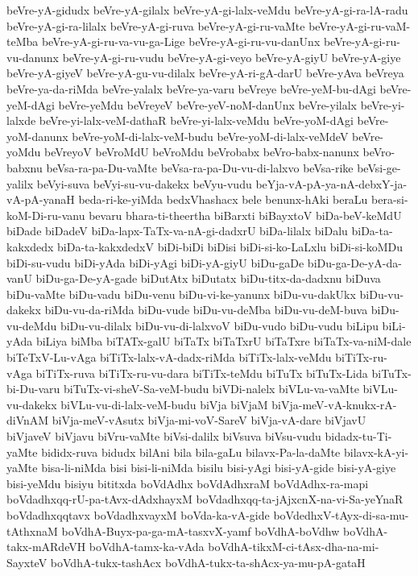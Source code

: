 {beVre-yA-gidudx
beVre-yA-gilalx
beVre-yA-gi-lalx-veMdu
beVre-yA-gi-ra-lA-radu
beVre-yA-gi-ra-lilalx
beVre-yA-gi-ruva
beVre-yA-gi-ru-vaMte
beVre-yA-gi-ru-vaM-teMba
beVre-yA-gi-ru-va-vu-ga-Lige
beVre-yA-gi-ru-vu-danUnx
beVre-yA-gi-ru-vu-danunx
beVre-yA-gi-ru-vudu
beVre-yA-gi-veyo
beVre-yA-giyU
beVre-yA-giye
beVre-yA-giyeV
beVre-yA-gu-vu-dilalx
beVre-yA-ri-gA-darU
beVre-yAva
beVreya
beVre-ya-da-riMda
beVre-yalalx
beVre-ya-varu
beVreye
beVre-yeM-bu-dAgi
beVre-yeM-dAgi
beVre-yeMdu
beVreyeV
beVre-yeV-noM-danUnx
beVre-yilalx
beVre-yi-lalxde
beVre-yi-lalx-veM-dathaR
beVre-yi-lalx-veMdu
beVre-yoM-dAgi
beVre-yoM-danunx
beVre-yoM-di-lalx-veM-budu
beVre-yoM-di-lalx-veMdeV
beVre-yoMdu
beVreyoV
beVroMdU
beVroMdu
beVrobabx
beVro-babx-nanunx
beVro-babxnu
beVsa-ra-pa-Du-vaMte
beVsa-ra-pa-Du-vu-di-lalxvo
beVsa-rike
beVsi-ge-yalilx
beVyi-suva
beVyi-su-vu-dakekx
beVyu-vudu
beYja-vA-pA-ya-nA-debxY-ja-vA-pA-yanaH
beda-ri-ke-yiMda
bedxVhashacx
bele
benunx-hAki
beraLu
bera-si-koM-Di-ru-vanu
bevaru
bhara-ti-theertha
biBarxti
biBayxtoV
biDa-beV-keMdU
biDade
biDadeV
biDa-lapx-TaTx-va-nA-gi-dadxrU
biDa-lilalx
biDalu
biDa-ta-kakxdedx
biDa-ta-kakxdedxV
biDi-biDi
biDisi
biDi-si-ko-LaLxlu
biDi-si-koMDu
biDi-su-vudu
biDi-yAda
biDi-yAgi
biDi-yA-giyU
biDu-gaDe
biDu-ga-De-yA-da-vanU
biDu-ga-De-yA-gade
biDutAtx
biDutatx
biDu-titx-da-dadxnu
biDuva
biDu-vaMte
biDu-vadu
biDu-venu
biDu-vi-ke-yanunx
biDu-vu-dakUkx
biDu-vu-dakekx
biDu-vu-da-riMda
biDu-vude
biDu-vu-deMba
biDu-vu-deM-buva
biDu-vu-deMdu
biDu-vu-dilalx
biDu-vu-di-lalxvoV
biDu-vudo
biDu-vudu
biLipu
biLi-yAda
biLiya
biMba
biTATx-galU
biTaTx
biTaTxrU
biTaTxre
biTaTx-va-niM-dale
biTeTxV-Lu-vAga
biTiTx-lalx-vA-dadx-riMda
biTiTx-lalx-veMdu
biTiTx-ru-vAga
biTiTx-ruva
biTiTx-ru-vu-dara
biTiTx-teMdu
biTuTx
biTuTx-Lida
biTuTx-bi-Du-varu
biTuTx-vi-sheV-Sa-veM-budu
biVDi-nalelx
biVLu-va-vaMte
biVLu-vu-dakekx
biVLu-vu-di-lalx-veM-budu
biVja
biVjaM
biVja-meV-vA-knukx-rA-diVnAM
biVja-meV-vAsutx
biVja-mi-voV-SareV
biVja-vA-dare
biVjavU
biVjaveV
biVjavu
biVru-vaMte
biVsi-dalilx
biVsuva
biVsu-vudu
bidadx-tu-Ti-yaMte
bididx-ruva
bidudx
bilAni
bila
bila-gaLu
bilavx-Pa-la-daMte
bilavx-kA-yi-yaMte
bisa-li-niMda
bisi
bisi-li-niMda
bisilu
bisi-yAgi
bisi-yA-gide
bisi-yA-giye
bisi-yeMdu
bisiyu
bititxda
boVdAdhx
boVdAdhxraM
boVdAdhx-ra-mapi
boVdadhxqq-rU-pa-tAvx-dAdxhayxM
boVdadhxqq-ta-jAjxcnX-na-vi-Sa-yeYnaR
boVdadhxqqtavx
boVdadhxvayxM
boVda-ka-vA-gide
boVdedhxV-tAyx-di-sa-mu-tAthxnaM
boVdhA-Buyx-pa-ga-mA-tasxvX-yamf
boVdhA-boVdhw
boVdhA-takx-mARdeVH
boVdhA-tamx-ka-vAda
boVdhA-tikxM-ci-tAsx-dha-na-mi-SayxteV
boVdhA-tukx-tashAcx
boVdhA-tukx-ta-shAcx-ya-mu-pA-gataH
}
